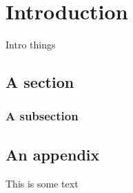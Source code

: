 \chapter{Introduction}
Intro things \lipsum
\cite{Munn1999,Chomsky1986}
\section{A section}
\lipsum[1]
\subsection{A subsection}
\lipsum[2]




\begin{appendix}
\chapter{An appendix}
This is some text
\end{appendix}
